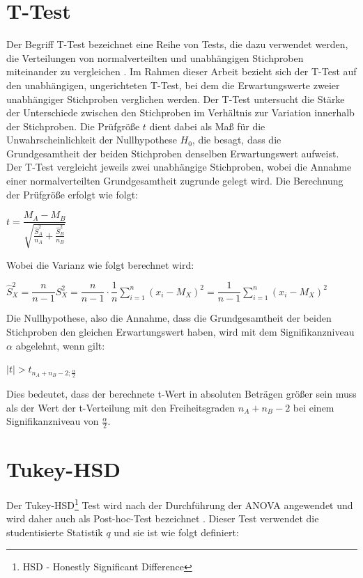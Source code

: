 \section{T-Test}
Der Begriff T-Test bezeichnet eine Reihe von Tests, die dazu verwendet werden, die Verteilungen von normalverteilten und unabhängigen Stichproben miteinander zu vergleichen \cite[S. 45 ff.]{inferenzstatistik}. 
Im Rahmen dieser Arbeit bezieht sich der T-Test auf den unabhängigen, ungerichteten T-Test, bei dem die Erwartungswerte zweier unabhängiger Stichproben verglichen werden.
Der T-Test untersucht die Stärke der Unterschiede zwischen den Stichproben im Verhältnis zur Variation innerhalb der Stichproben. 
Die Prüfgröße $t$ dient dabei als Maß für die Unwahrscheinlichkeit der Nullhypothese $H_0$, die besagt, 
dass die Grundgesamtheit der beiden Stichproben denselben Erwartungswert aufweist. 
Der T-Test vergleicht jeweils zwei unabhängige Stichproben, wobei die Annahme einer normalverteilten Grundgesamtheit zugrunde gelegt wird. 
Die Berechnung der Prüfgröße erfolgt wie folgt:

\begin{center}
  $t = \dfrac{M_A-M_B}{\sqrt{\frac{\hat{S}_A^2}{n_A} + \frac{\hat{S}_B^2}{n_B}}}$
\end{center}

Wobei die Varianz wie folgt berechnet wird:

\begin{center}
  $\hat{S}_X^2 = \dfrac{n}{n-1} S_X^2 = \dfrac{n}{n-1} \cdot \dfrac{1}{n} \sum_{i=1}^n (x_i - M_X)^2 = \dfrac{1}{n-1} \sum_{i=1}^n (x_i - M_X)^2$
\end{center}

Die Nullhypothese, also die Annahme, dass die Grundgesamtheit der beiden Stichproben 
den gleichen Erwartungswert haben, wird mit dem Signifikanzniveau $\alpha$ abgelehnt, wenn gilt:

\begin{center}
  $|t| > t_{n_A + n_B - 2; \frac{\alpha}{2}}$
\end{center}

Dies bedeutet, dass der berechnete t-Wert in absoluten Beträgen größer sein muss als der Wert der t-Verteilung
mit den Freiheitsgraden $n_A+n_B-2$ bei einem Signifikanzniveau von $\frac{\alpha}{2}$.

\newpage

\section{Tukey-HSD}
Der Tukey-HSD\footnote{HSD - Honestly Significant Difference} Test wird nach der Durchführung der ANOVA angewendet und wird daher auch als Post-hoc-Test bezeichnet \cite[S. 391 ff.]{tukey_hsd_book}.
Dieser Test verwendet die studentisierte Statistik $q$ und sie ist wie folgt definiert:

